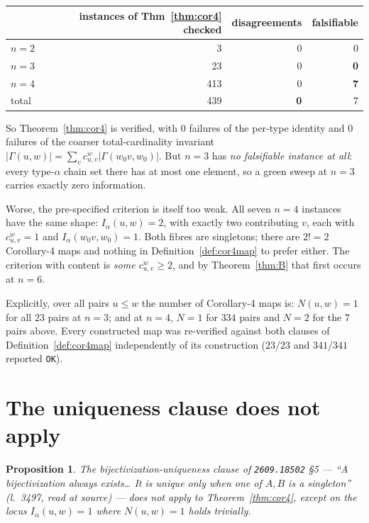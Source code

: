 \documentclass[11pt]{article}
\theoremstyle{plain}
\newtheorem{proposition}[theorem]{Proposition}
\theoremstyle{definition}
\newcommand{\Gam}{\Gamma}
\newcommand{\wo}{w_0}
\begin{document}
\begin{center}
\begin{tabular}{lrrr}
\toprule
 & instances of Thm~\ref{thm:cor4} checked & disagreements & falsifiable\\
\midrule
$n=2$ & 3 & 0 & 0\\
$n=3$ & 23 & 0 & \textbf{0}\\
$n=4$ & 413 & 0 & \textbf{7}\\
\midrule
total & 439 & \textbf{0} & 7\\
\bottomrule
\end{tabular}
\end{center}

So Theorem~\ref{thm:cor4} is verified, with $0$ failures of the per-type identity
and $0$ failures of the coarser total-cardinality invariant
$|\Gam(u,w)|=\sum_v c^w_{u,v}|\Gam(\wo v,\wo)|$.  But $n=3$ has
\emph{no falsifiable instance at all}: every type-$\alpha$ chain set there has at
most one element, so a green sweep at $n=3$ carries exactly zero information.

Worse, the pre-specified criterion is itself too weak.  All seven $n=4$ instances
have the same shape: $I_\alpha(u,w)=2$, with exactly two contributing $v$, each
with $c^w_{u,v}=1$ and $I_\alpha(\wo v,\wo)=1$.  Both fibres are singletons;
there are $2!=2$ Corollary-4 maps and nothing in Definition~\ref{def:cor4map} to
prefer either.  The criterion with content is \emph{some $c^w_{u,v}\ge2$}, and by
Theorem~\ref{thm:B} that first occurs at $n=6$.

Explicitly, over all pairs $u\le w$ the number of Corollary-4 maps is:
$N(u,w)=1$ for all $23$ pairs at $n=3$; and at $n=4$, $N=1$ for $334$ pairs and
$N=2$ for the $7$ pairs above.  Every constructed map was re-verified against
both clauses of Definition~\ref{def:cor4map} independently of its construction
($23/23$ and $341/341$ reported \texttt{OK}).

\section{The uniqueness clause does not apply}

\begin{proposition}\label{prop:C}
The bijectivization-uniqueness clause of \texttt{2609.18502} \S5 ---
\emph{``A bijectivization always exists\ldots{} It is unique only when one of
$A,B$ is a singleton''} (l.~3497, read at source) --- does not apply to
Theorem~\ref{thm:cor4}, except on the locus $I_\alpha(u,w)=1$ where
$N(u,w)=1$ holds trivially.
\end{proposition}
\end{document}

